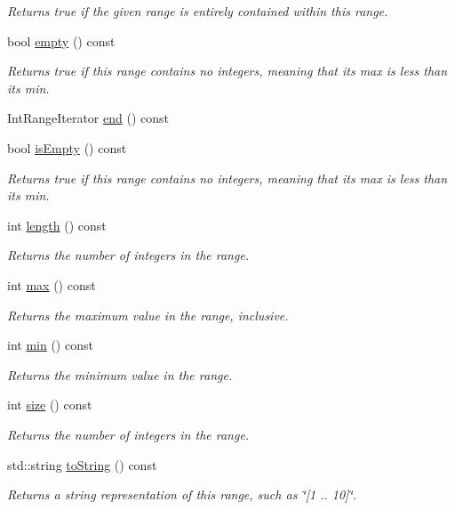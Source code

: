 \begin{DoxyCompactItemize}
\begin{DoxyCompactList}\small\item\em Returns true if the given range is entirely contained within this range. \end{DoxyCompactList}\item 
bool \mbox{\hyperlink{classIntRange_a644718bb2fb240de962dc3c9a1fdf0dc}{empty}} () const
\begin{DoxyCompactList}\small\item\em Returns true if this range contains no integers, meaning that its max is less than its min. \end{DoxyCompactList}\item 
Int\+Range\+Iterator \mbox{\hyperlink{classIntRange_ad919bd40bd4298cafd0955b8031f4bef}{end}} () const
\item 
bool \mbox{\hyperlink{classIntRange_acf82f9b2937375c7b1cf3dccb3df3312}{is\+Empty}} () const
\begin{DoxyCompactList}\small\item\em Returns true if this range contains no integers, meaning that its max is less than its min. \end{DoxyCompactList}\item 
int \mbox{\hyperlink{classIntRange_a91213974fa3ac3959b1c355a9e588f8d}{length}} () const
\begin{DoxyCompactList}\small\item\em Returns the number of integers in the range. \end{DoxyCompactList}\item 
int \mbox{\hyperlink{classIntRange_a86ad4228f3fccc681e8716ac9c68ab4d}{max}} () const
\begin{DoxyCompactList}\small\item\em Returns the maximum value in the range, inclusive. \end{DoxyCompactList}\item 
int \mbox{\hyperlink{classIntRange_a4ec1ccea7eddbc7355ba5d00afcaec2d}{min}} () const
\begin{DoxyCompactList}\small\item\em Returns the minimum value in the range. \end{DoxyCompactList}\item 
int \mbox{\hyperlink{classIntRange_af9593d4a5ff4274efaf429cb4f9e57cc}{size}} () const
\begin{DoxyCompactList}\small\item\em Returns the number of integers in the range. \end{DoxyCompactList}\item 
std\+::string \mbox{\hyperlink{classIntRange_a1fe5121d6528fdea3f243321b3fa3a49}{to\+String}} () const
\begin{DoxyCompactList}\small\item\em Returns a string representation of this range, such as \char`\"{}\mbox{[}1 .. 10\mbox{]}\char`\"{}. \end{DoxyCompactList}\end{DoxyCompactItemize}


